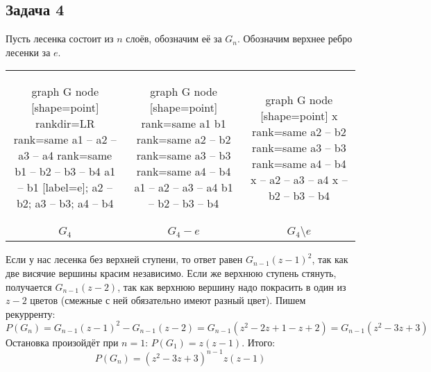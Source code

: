 \subsection{Задача 4}
	Пусть лесенка состоит из $n$ слоёв, обозначим её за $G_n$.
	Обозначим верхнее ребро лесенки за $e$.
	\begin{center}
		\begin{tabular}{ccc}
			\begin{minipage}{2cm}\begin{center}
				\begin{dot2tex}[options=-tmath]
					graph G {
						node [shape=point]
					    rankdir=LR
						{ rank=same a1 -- a2 -- a3 -- a4 }
						{ rank=same b1 -- b2 -- b3 -- b4}
						a1 -- b1 [label=e]; a2 -- b2; a3 -- b3; a4 -- b4
					}
				\end{dot2tex}
			\end{center}\end{minipage}
			&
			\begin{minipage}{2cm}\begin{center}
				\begin{dot2tex}[options=-tmath]
					graph G {
						node [shape=point]
						{ rank=same a1 b1 }
						{ rank=same a2 -- b2 }
						{ rank=same a3 -- b3 }
						{ rank=same a4 -- b4 }
						a1 -- a2 -- a3 -- a4
						b1 -- b2 -- b3 -- b4
					}
				\end{dot2tex}
			\end{center}\end{minipage}
			&
			\begin{minipage}{2cm}\begin{center}
				\begin{dot2tex}[options=-tmath]
					graph G {
						node [shape=point]
						x
						{ rank=same a2 -- b2 }
						{ rank=same a3 -- b3 }
						{ rank=same a4 -- b4 }
						x -- a2 -- a3 -- a4
						x -- b2 -- b3 -- b4
					}
				\end{dot2tex}
			\end{center}\end{minipage}
			\\
			$G_4$ & $G_4 - e$ & $G_4 \setminus e$
		\end{tabular}
	\end{center}

	Если у нас лесенка без верхней ступени, то ответ равен $G_{n-1}(z-1)^2$, так как две висячие вершины красим независимо.
	Если же верхнюю ступень стянуть, получается $G_{n-1}(z-2)$, так как верхнюю вершину надо покрасить в один из $z-2$ цветов (смежные с ней обязательно имеют разный цвет).
	Пишем рекурренту:
	\[
		P(G_n) = G_{n-1}(z-1)^2 - G_{n-1}(z-2) = G_{n-1}(z^2-2z+1-z+2) = G_{n-1}(z^2-3z+3)
	\]
	Остановка произойдёт при $n=1$: $P(G_1)=z(z-1)$.
	Итого:
	\[
		P(G_n) = (z^2-3z+3)^{n-1}z(z-1)
	\]
